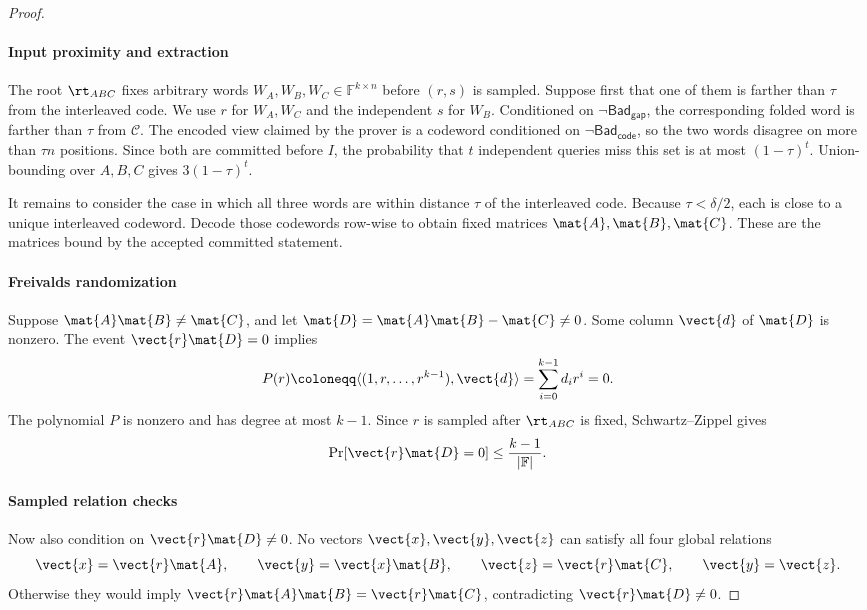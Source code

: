 \begin{proof}
\paragraph{Input proximity and extraction}
The root \(\rt_{ABC}\) fixes arbitrary words
\(W_A,W_B,W_C\in\mathbb{F}^{k\times n}\) before \((r,s)\) is sampled.
Suppose first that one of them is farther than \(\tau\) from the interleaved
code.  We use \(r\) for \(W_A,W_C\) and the independent \(s\) for \(W_B\).
Conditioned on \(\neg\mathsf{Bad}_{\mathsf{gap}}\), the corresponding folded
word is farther than \(\tau\) from \(\mathcal{C}\).  The encoded view claimed
by the prover is a codeword conditioned on
\(\neg\mathsf{Bad}_{\mathsf{code}}\), so the two words disagree on more than
\(\tau n\) positions.  Since both are committed before \(I\), the probability
that \(t\) independent queries miss this set is at most \((1-\tau)^t\).
Union-bounding over \(A,B,C\) gives \(3(1-\tau)^t\).

It remains to consider the case in which all three words are within distance
\(\tau\) of the interleaved code.  Because \(\tau<\delta/2\), each is close
to a unique interleaved codeword.  Decode those codewords row-wise to obtain
fixed matrices \(\mat{A},\mat{B},\mat{C}\).  These are the matrices bound by
the accepted committed statement.

\paragraph{Freivalds randomization}
Suppose \(\mat{A}\mat{B}\neq\mat{C}\), and let
\(\mat{D}=\mat{A}\mat{B}-\mat{C}\neq 0\).  Some column
\(\vect{d}\) of \(\mat{D}\) is nonzero.  The event
\(\vect{r}\mat{D}=0\) implies
\[
  P(r)
  \coloneqq
  \langle (1,r,\ldots,r^{k-1}),\vect{d}\rangle
  =
  \sum_{i=0}^{k-1} d_i r^i
  =
  0 .
\]
The polynomial \(P\) is nonzero and has degree at most \(k-1\).  Since \(r\)
is sampled after \(\rt_{ABC}\) is fixed, Schwartz--Zippel gives
\[
  \Pr[\vect{r}\mat{D}=0]
  \le
  \frac{k-1}{|\mathbb{F}|}.
\]

\paragraph{Sampled relation checks}
Now also condition on \(\vect{r}\mat{D}\neq 0\).  No vectors
\(\vect{x},\vect{y},\vect{z}\) can satisfy all four global relations
\[
  \vect{x}=\vect{r}\mat{A},
  \qquad
  \vect{y}=\vect{x}\mat{B},
  \qquad
  \vect{z}=\vect{r}\mat{C},
  \qquad
  \vect{y}=\vect{z}.
\]
Otherwise they would imply
\(\vect{r}\mat{A}\mat{B}=\vect{r}\mat{C}\), contradicting
\(\vect{r}\mat{D}\neq 0\).


\end{proof}
